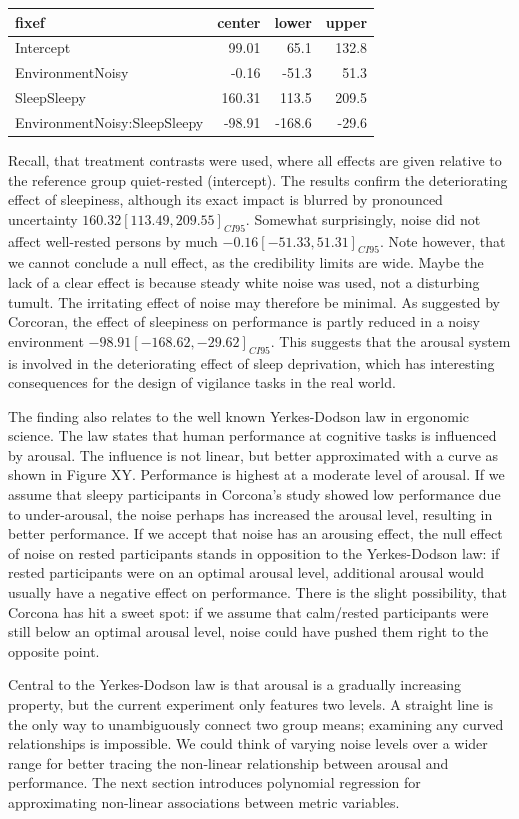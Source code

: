 \documentclass[]{svmono}
\begin{document}
\begin{longtable}[]{@{}lrrr@{}}
\toprule
fixef & center & lower & upper\tabularnewline
\midrule
\endhead
Intercept & 99.01 & 65.1 & 132.8\tabularnewline
EnvironmentNoisy & -0.16 & -51.3 & 51.3\tabularnewline
SleepSleepy & 160.31 & 113.5 & 209.5\tabularnewline
EnvironmentNoisy:SleepSleepy & -98.91 & -168.6 & -29.6\tabularnewline
\bottomrule
\end{longtable}

Recall, that treatment contrasts were used, where all effects are given
relative to the reference group quiet-rested (intercept). The results
confirm the deteriorating effect of sleepiness, although its exact
impact is blurred by pronounced uncertainty
\(160.32 [113.49, 209.55]_{CI95}\). Somewhat surprisingly, noise did not
affect well-rested persons by much \(-0.16 [-51.33, 51.31]_{CI95}\).
Note however, that we cannot conclude a null effect, as the credibility
limits are wide. Maybe the lack of a clear effect is because steady
white noise was used, not a disturbing tumult. The irritating effect of
noise may therefore be minimal. As suggested by Corcoran, the effect of
sleepiness on performance is partly reduced in a noisy environment
\(-98.91 [-168.62, -29.62]_{CI95}\). This suggests that the arousal
system is involved in the deteriorating effect of sleep deprivation,
which has interesting consequences for the design of vigilance tasks in
the real world.

The finding also relates to the well known Yerkes-Dodson law in
ergonomic science. The law states that human performance at cognitive
tasks is influenced by arousal. The influence is not linear, but better
approximated with a curve as shown in Figure XY. Performance is highest
at a moderate level of arousal. If we assume that sleepy participants in
Corcona's study showed low performance due to under-arousal, the noise
perhaps has increased the arousal level, resulting in better
performance. If we accept that noise has an arousing effect, the null
effect of noise on rested participants stands in opposition to the
Yerkes-Dodson law: if rested participants were on an optimal arousal
level, additional arousal would usually have a negative effect on
performance. There is the slight possibility, that Corcona has hit a
sweet spot: if we assume that calm/rested participants were still below
an optimal arousal level, noise could have pushed them right to the
opposite point.

Central to the Yerkes-Dodson law is that arousal is a gradually
increasing property, but the current experiment only features two
levels. A straight line is the only way to unambiguously connect two
group means; examining any curved relationships is impossible. We could
think of varying noise levels over a wider range for better tracing the
non-linear relationship between arousal and performance. The next
section introduces polynomial regression for approximating non-linear
associations between metric variables.
\end{document}
